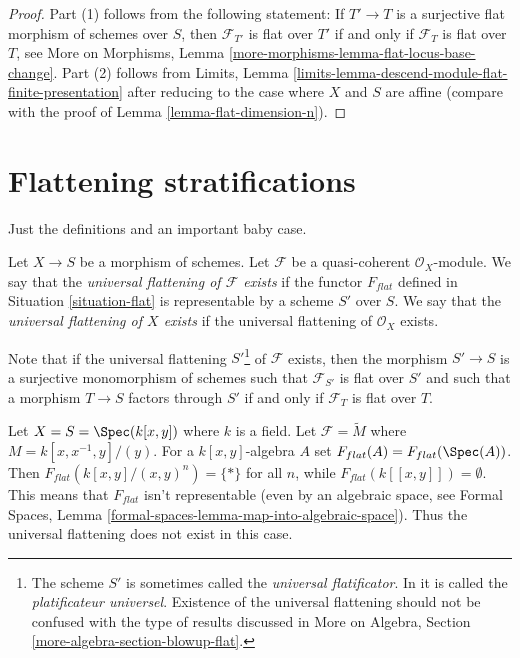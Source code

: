 \begin{proof}
Part (1) follows from the following statement: If $T' \to T$ is a surjective
flat morphism of schemes over $S$, then $\mathcal{F}_{T'}$ is flat over $T'$
if and only if $\mathcal{F}_T$ is flat over $T$, see
More on Morphisms, Lemma \ref{more-morphisms-lemma-flat-locus-base-change}.
Part (2) follows from
Limits, Lemma \ref{limits-lemma-descend-module-flat-finite-presentation}
after reducing to the case where $X$ and $S$ are affine (compare with
the proof of
Lemma \ref{lemma-flat-dimension-n}).
\end{proof}




\section{Flattening stratifications}
\label{section-flattening}

\noindent
Just the definitions and an important baby case.

\begin{definition}
\label{definition-flattening}
Let $X \to S$ be a morphism of schemes.
Let $\mathcal{F}$ be a quasi-coherent $\mathcal{O}_X$-module.
We say that the {\it universal flattening of $\mathcal{F}$ exists}
if the functor $F_{flat}$ defined in Situation \ref{situation-flat}
is representable by a scheme $S'$ over $S$.
We say that the {\it universal flattening of $X$ exists}
if the universal flattening of $\mathcal{O}_X$ exists.
\end{definition}

\noindent
Note that if the universal flattening $S'$\footnote{The scheme $S'$ is sometimes
called the {\it universal flatificator}. In \cite{GruRay} it is called
the {\it platificateur universel}. Existence of the universal flattening
should not be confused with the type of results discussed in
More on Algebra, Section \ref{more-algebra-section-blowup-flat}.} of
$\mathcal{F}$ exists, then the morphism $S' \to S$ is a surjective
monomorphism of schemes such that $\mathcal{F}_{S'}$ is flat over $S'$
and such that a morphism $T \to S$ factors through $S'$ if and only if
$\mathcal{F}_T$ is flat over $T$.

\begin{example}
\label{example-no-universal-flattening}
Let $X = S = \Spec(k[x, y])$ where $k$ is a field. Let
$\mathcal{F} = \widetilde{M}$ where $M = k[x, x^{-1}, y]/(y)$.
For a $k[x, y]$-algebra $A$ set $F_{flat}(A) = F_{flat}(\Spec(A))$.
Then $F_{flat}(k[x, y]/(x, y)^n) = \{*\}$ for all $n$, while
$F_{flat}(k[[x, y]]) = \emptyset$. This means that $F_{flat}$ isn't
representable (even by an algebraic space, see
Formal Spaces, Lemma
\ref{formal-spaces-lemma-map-into-algebraic-space}).
Thus the universal flattening does not exist in this case.
\end{example}

